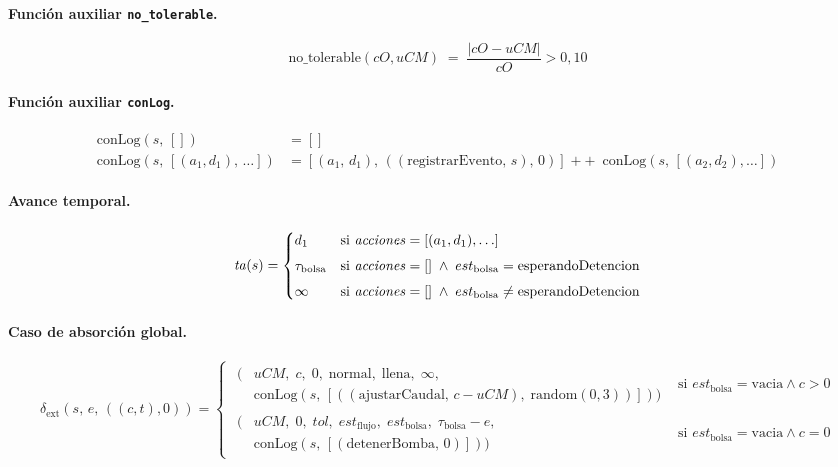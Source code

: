 \paragraph{Función auxiliar \texttt{no\_tolerable}.}
\[
  \mathrm{no\_tolerable}(cO,uCM)
  \;=\;
  \frac{|cO-uCM|}{cO} > 0{,}10
\]

\paragraph{Función auxiliar \texttt{conLog}.}
\begin{align*}
  \mathrm{conLog}(s,\, []) &= [] \\[4pt]
  \mathrm{conLog}(s,\, [(a_1, d_1),\, \ldots]) &=
    [(a_1,\, d_1),\, ((\mathrm{registrarEvento},\, s),\, 0)]
    \;\mathbin{+\!\!+}\;
    \mathrm{conLog}(s,\, [(a_2, d_2), \ldots])
\end{align*}

\paragraph{Avance temporal.}
\[
  \mathit{ta}(s) =
  \begin{cases}
    d_1
      & \text{si } \mathit{acciones} = [(a_1,d_1),\ldots] \\[4pt]
    \tau_{\mathrm{bolsa}}
      & \text{si } \mathit{acciones} = []
        \;\land\; est_{\mathrm{bolsa}} = \mathrm{esperandoDetencion} \\[4pt]
    \infty
      & \text{si } \mathit{acciones} = []
        \;\land\; est_{\mathrm{bolsa}} \neq \mathrm{esperandoDetencion}
  \end{cases}
\]

\paragraph{Caso de absorción global.}
\[
\delta_{\mathrm{ext}}(s,\,e,\,((c,t),0)) =
\begin{cases}
  \begin{aligned}
    \bigl(&uCM,\;c,\;0,\;\mathrm{normal},\;\mathrm{llena},\;\infty,\; \\
          &\mathrm{conLog}(s,\,[((\mathrm{ajustarCaudal},\,c - uCM),\; \mathrm{random}(0,3))])\bigr)
  \end{aligned}
  & \text{si } est_{\mathrm{bolsa}} = \mathrm{vacia} \land c > 0 \\[3ex]
  \begin{aligned}
    \bigl(&uCM,\;0,\;tol,\;est_{\mathrm{flujo}},\;est_{\mathrm{bolsa}},\; \tau_{\mathrm{bolsa}}-e,\; \\
          &\mathrm{conLog}(s,\,[(\mathrm{detenerBomba},\,0)])\bigr)
  \end{aligned}
  & \text{si } est_{\mathrm{bolsa}} = \mathrm{vacia} \land c = 0
\end{cases}
\]

